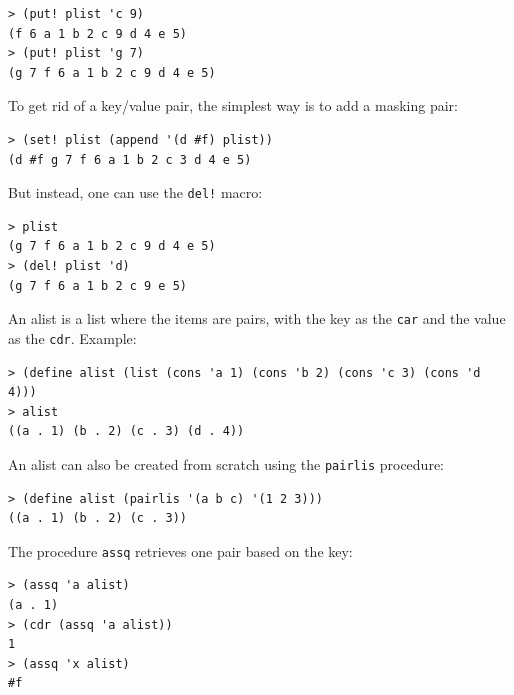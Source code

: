 \documentclass[twoside,9pt]{report}
\begin{document}
{\noindent\makebox[\linewidth]{\rule{\linewidth}{0.4pt}}
\begin{lstlisting}
> (put! plist 'c 9)
(f 6 a 1 b 2 c 9 d 4 e 5)
> (put! plist 'g 7)
(g 7 f 6 a 1 b 2 c 9 d 4 e 5)
\end{lstlisting}
\noindent\makebox[\linewidth]{\rule{\linewidth}{0.4pt}}

To get rid of a key/value pair, the simplest way is to add a masking pair:

\noindent\makebox[\linewidth]{\rule{\linewidth}{0.4pt}}
\begin{lstlisting}
> (set! plist (append '(d #f) plist))
(d #f g 7 f 6 a 1 b 2 c 3 d 4 e 5)
\end{lstlisting}
\noindent\makebox[\linewidth]{\rule{\linewidth}{0.4pt}}

But instead, one can use the \texttt{del!} macro:

\noindent\makebox[\linewidth]{\rule{\linewidth}{0.4pt}}
\begin{lstlisting}
> plist
(g 7 f 6 a 1 b 2 c 9 d 4 e 5)
> (del! plist 'd)
(g 7 f 6 a 1 b 2 c 9 e 5)
\end{lstlisting}
\noindent\makebox[\linewidth]{\rule{\linewidth}{0.4pt}}

An alist is a list where the items are pairs, with the key as the \texttt{car} and the value as the \texttt{cdr}. Example:

\noindent\makebox[\linewidth]{\rule{\linewidth}{0.4pt}}
\begin{lstlisting}
> (define alist (list (cons 'a 1) (cons 'b 2) (cons 'c 3) (cons 'd 4)))
> alist
((a . 1) (b . 2) (c . 3) (d . 4))
\end{lstlisting}
\noindent\makebox[\linewidth]{\rule{\linewidth}{0.4pt}}

An alist can also be created from scratch using the \texttt{pairlis} procedure:

\noindent\makebox[\linewidth]{\rule{\linewidth}{0.4pt}}
\begin{lstlisting}
> (define alist (pairlis '(a b c) '(1 2 3)))
((a . 1) (b . 2) (c . 3))
\end{lstlisting}
\noindent\makebox[\linewidth]{\rule{\linewidth}{0.4pt}}

The procedure \texttt{assq} retrieves one pair based on the key:

\noindent\makebox[\linewidth]{\rule{\linewidth}{0.4pt}}
\begin{lstlisting}
> (assq 'a alist)
(a . 1)
> (cdr (assq 'a alist))
1
> (assq 'x alist)
#f
\end{lstlisting}
\noindent\makebox[\linewidth]{\rule{\linewidth}{0.4pt}}

}
\end{document}
